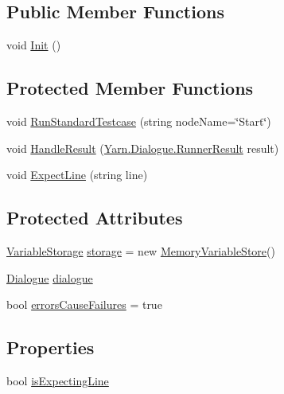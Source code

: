\subsection*{Public Member Functions}
\begin{DoxyCompactItemize}
\item 
void \hyperlink{a00146_a357a0dab579f9e45666c10779683dc27}{Init} ()
\end{DoxyCompactItemize}
\subsection*{Protected Member Functions}
\begin{DoxyCompactItemize}
\item 
void \hyperlink{a00146_abffa134d40d72b21e6b35c3bf05fc53f}{Run\-Standard\-Testcase} (string node\-Name=\char`\"{}Start\char`\"{})
\item 
void \hyperlink{a00146_a7b525f85a26d7c942e1cbfa5d6453893}{Handle\-Result} (\hyperlink{a00132}{Yarn.\-Dialogue.\-Runner\-Result} result)
\item 
void \hyperlink{a00146_ac21a5082ddac1da9db17ae54038df44e}{Expect\-Line} (string line)
\end{DoxyCompactItemize}
\subsection*{Protected Attributes}
\begin{DoxyCompactItemize}
\item 
\hyperlink{a00166}{Variable\-Storage} \hyperlink{a00146_a23d59ace1516ca72924c6fe3feafd3f7}{storage} = new \hyperlink{a00110}{Memory\-Variable\-Store}()
\item 
\hyperlink{a00072}{Dialogue} \hyperlink{a00146_a4cff5de56c4b8a91c76b6eb2d622a795}{dialogue}
\item 
bool \hyperlink{a00146_ac978fe85db843c51411f5517bdbe0eb8}{errors\-Cause\-Failures} = true
\end{DoxyCompactItemize}
\subsection*{Properties}
\begin{DoxyCompactItemize}
\item 
bool \hyperlink{a00146_a47f35b8e8123ed9471883d02b8bc9f3e}{is\-Expecting\-Line}
\end{DoxyCompactItemize}
